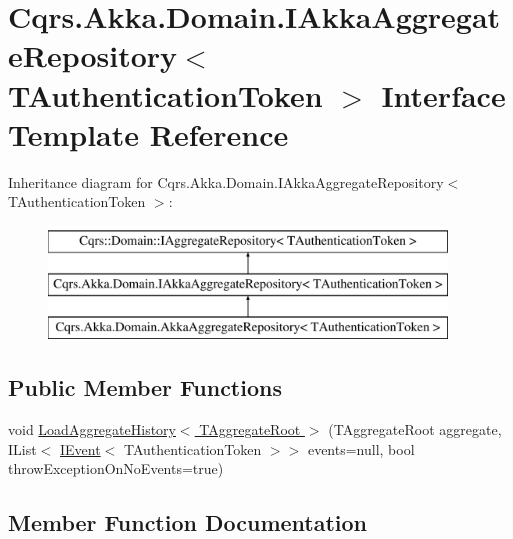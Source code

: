 \hypertarget{interfaceCqrs_1_1Akka_1_1Domain_1_1IAkkaAggregateRepository}{}\section{Cqrs.\+Akka.\+Domain.\+I\+Akka\+Aggregate\+Repository$<$ T\+Authentication\+Token $>$ Interface Template Reference}
\label{interfaceCqrs_1_1Akka_1_1Domain_1_1IAkkaAggregateRepository}
Inheritance diagram for Cqrs.\+Akka.\+Domain.\+I\+Akka\+Aggregate\+Repository$<$ T\+Authentication\+Token $>$\+:\begin{figure}[H]
\begin{center}
\leavevmode
\includegraphics[height=3.000000cm]{interfaceCqrs_1_1Akka_1_1Domain_1_1IAkkaAggregateRepository}
\end{center}
\end{figure}
\subsection*{Public Member Functions}
\begin{DoxyCompactItemize}
\item 
void \hyperlink{interfaceCqrs_1_1Akka_1_1Domain_1_1IAkkaAggregateRepository_a9010b259daf5d09f7269277361015ddf_a9010b259daf5d09f7269277361015ddf}{Load\+Aggregate\+History$<$ T\+Aggregate\+Root $>$} (T\+Aggregate\+Root aggregate, I\+List$<$ \hyperlink{interfaceCqrs_1_1Events_1_1IEvent}{I\+Event}$<$ T\+Authentication\+Token $>$$>$ events=null, bool throw\+Exception\+On\+No\+Events=true)
\end{DoxyCompactItemize}


\subsection{Member Function Documentation}
\mbox{\label{interfaceCqrs_1_1Akka_1_1Domain_1_1IAkkaAggregateRepository_a9010b259daf5d09f7269277361015ddf_a9010b259daf5d09f7269277361015ddf}} 
